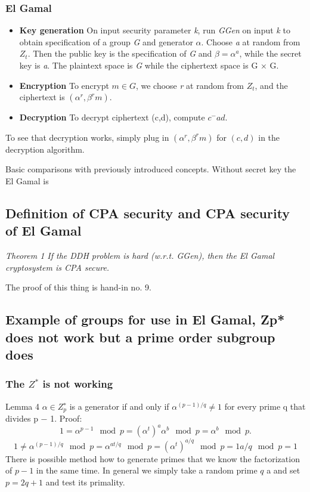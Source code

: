 \documentclass[a4paper,10pt]{article}
\begin{document}
\subsubsection*{El Gamal}
\begin{itemize}
\item 
\textbf{Key generation} On input security parameter \textit{k}, run \textit{GGen} on input \textit{k} to obtain specification of a group \textit{G} and generator $\alpha$. Choose \textit{a} at random from $Z_t$. Then the public key is the specification of \textit{G} and $\beta = \alpha^a$, while the secret key is \textit{a}. The plaintext space is \textit{G} while the ciphertext space is G × G.
\item 
\textbf{Encryption} To encrypt $m \in G$, we choose \textit{r} at random from $Z_t$, and the
ciphertext is $(\alpha^r,\beta^rm)$.
\item 
\textbf{Decryption} To decrypt ciphertext (c,d), compute $c^−ad$.
\end{itemize}
To see that decryption works, simply plug in $(\alpha^r,\beta^rm)$ for $(c,d)$ in the decryption algorithm.

Basic comparisons with previously introduced concepts. Without secret key the El Gamal is 
\subsection*{Definition of CPA security and CPA security of El Gamal}
\textit{Theorem 1 If the DDH problem is hard (w.r.t. GGen), then the El Gamal
cryptosystem is CPA secure.}

The proof of this thing is hand-in no. 9.

\subsection*{Example of groups for use in El Gamal, Zp* does not work but a prime order subgroup does}
\subsubsection*{The $Z^{*}$ is not working}
Lemma 4 $\alpha \in Z^{∗}_p$ is a generator if and only if $\alpha^{(p−1)/q} \neq 1$ for every prime
q that divides p − 1.
Proof:
$$
1 = \alpha^{p−1}\mod p = (\alpha^t)^a \alpha^b \mod p = \alpha^b \mod p.
$$
$$
1 \neq \alpha^{(p−1)/q}\mod p = \alpha^{at/q}\mod p = (\alpha^t)^{a/q}\mod p = 1a/q \mod p = 1
$$
There is possible method how to generate primes that we know the factorization of $p-1$ in the same time. In general we simply take a random prime $q$ a and set $p=2q+1$ and test its primality.
\end{document}
